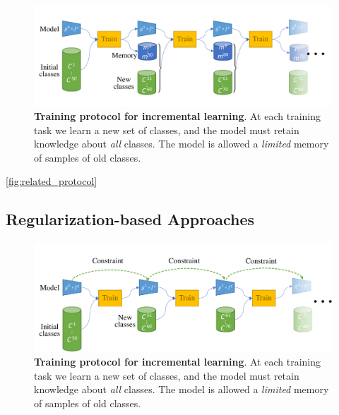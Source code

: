 \begin{figure}[tb]
      \begin{center}
            \includegraphics[width=1.0\linewidth]{images/related/rehearsal}
      \end{center}
      \caption{\textbf{Training protocol for incremental learning}. At each training task we learn a
            new set of classes, and the model must retain knowledge about \textit{all} classes. The
            model is allowed a \textit{limited} memory of samples of old classes.}
      \label{fig:related_protocol}
\end{figure}

\autoref{fig:related_protocol}


\subsection{Regularization-based Approaches}
\label{sec:related_regul}


\begin{figure}[tb]
      \begin{center}
            \includegraphics[width=1.0\linewidth]{images/related/constraints}
      \end{center}
      \caption{\textbf{Training protocol for incremental learning}. At each training task we learn a
            new set of classes, and the model must retain knowledge about \textit{all} classes. The
            model is allowed a \textit{limited} memory of samples of old classes.}
      \label{fig:related_protocol}
\end{figure}

